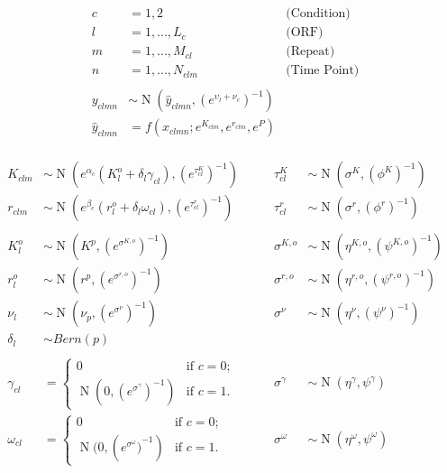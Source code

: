 \documentclass[11pt,a4paper]{article}
\begin{document}
\begin{align*}
c&=1,2 \qquad & \text{(Condition)}\\
l&=1,...,L_{c}  \qquad & \text{(ORF)}\\
m&=1,...,M_{cl}      \qquad & \text{(Repeat)}\\
n&=1,...,N_{clm}     \qquad & \text{(Time Point)}\\
\\
y_{clmn} &\sim \operatorname{N}(\hat{y}_{clmn},(e^{ \upsilon_{l}+\nu_{c}  })^{-1} ) \\
\hat{y}_{clmn} &= f(x_{clmn};e^{ K_{clm} } ,e^{ r_{clm} } , e^{ P })\\
\end{align*}

\begin{align*}
K_{clm} &\sim \operatorname{N}(e^{\alpha_{c}}(K_{l}^o+\delta_{l}\gamma_{cl}),(e^{ \tau_{cl}^K })^{-1})\qquad &\tau_{cl}^K &\sim \operatorname{N}(\sigma^{K}, (\phi^{K})^{-1} )\\
r_{clm} &\sim \operatorname{N}(e^{\beta_{c}}(r_{l}^o+\delta_{l}\omega_{cl}),(e^{ \tau_{cl}^r })^{-1})\qquad &\tau_{cl}^r &\sim \operatorname{N}(\sigma^{r}, (\phi^{r})^{-1} )\\
\\
K_{l}^o &\sim \operatorname{N}(K^p, (e^{ \sigma^{K,o} })^{-1} )\qquad &\sigma^{K,o} &\sim \operatorname{N}(\eta^{K,o}, (\psi^{K,o})^{-1} )\\
r_{l}^o &\sim \operatorname{N}(r^p, (e^{ \sigma^{r,o} })^{-1} )\qquad &\sigma^{r,o} &\sim \operatorname{N}(\eta^{r,o}, (\psi^{r,o})^{-1} )\\
\nu_{l} &\sim \operatorname{N}(\nu_{p},(e^{ \sigma^{\nu} })^{-1})\qquad&\sigma^{\nu} &\sim \operatorname{N}(\eta^{\nu}, (\psi^{\nu})^{-1} )\\
\delta_{l} &\sim Bern(p)\\
\\
\gamma_{cl}&= \begin{cases}
0  & \text{if } c=0;\\
\operatorname{N}(0,{(e^{\sigma^{\gamma}})}^{-1}) & \text{if } c=1.
\end{cases}
\qquad
&\sigma^{\gamma}&\sim \operatorname{N}(\eta^{\gamma},\psi^{\gamma})
\\
\omega_{cl}&= \begin{cases}
0  & \text{if } c=0;\\
\operatorname{N}(0,({e^{\sigma^{\omega}})}^{-1}) & \text{if } c=1.
\end{cases}
\qquad
&\sigma^{\omega}&\sim \operatorname{N}(\eta^{\omega},\psi^{\omega})
\end{align*}
\end{document}
